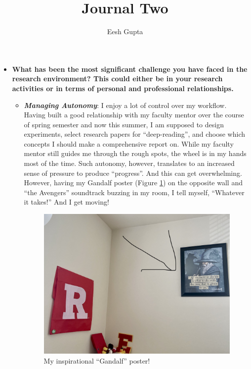\documentclass{article}
\title{Journal Two \footnotemark}
\author{Eesh Gupta}
\newcommand{\s}{\item[]}
\begin{document}
\maketitle
{}






\begin{itemize}
\item \textbf{What has been the most significant challenge you have faced in the research environment? This could either be in your
research activities or in terms of personal and professional relationships.}
\begin{itemize}
  \s \textit{\textbf{Managing Autonomy}}: I enjoy a lot of control over my
  workflow. Having built a good relationship with my faculty mentor over
  the course of spring semester and now this summer, I am supposed to
  design experiments, select research papers for ``deep-reading'', and
  choose which concepts I should make a comprehensive report on. While
  my faculty mentor still guides me through the rough spots, the wheel
  is in my hands most of the time. Such autonomy, however, translates to an increased sense of
  pressure to produce ``progress''. And this can get overwhelming. However,
  having my Gandalf poster (Figure \ref{fig1}) on the opposite wall and ``the Avengers'' soundtrack buzzing
  in my room, I tell myself, ``Whatever it takes!'' And I get moving!
  \begin{figure}[!htb]
	\centering
	\includegraphics[width=1\textwidth]{img/JournalTwo-c8f6d4a9.png}
	\caption{My inspirational ``Gandalf'' poster!}
	\label{fig1}
\end{figure}


\end{itemize}
\end{itemize}
\end{document}
